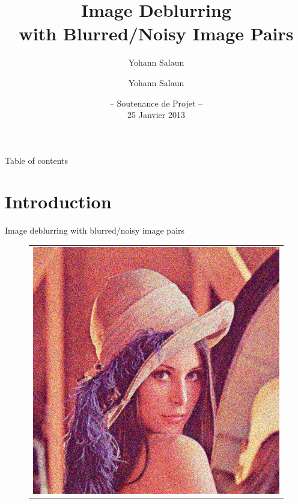 \documentclass[french]{beamer}
\title[Image Deblurring with Blurred/Noisy Image Pairs]{Image Deblurring \\ with Blurred/Noisy Image Pairs}
\author{Yohann Salaun}
\author[Yohann Salaun] 
{Yohann Salaun}
\institute[MVA - Introduction à l'imagerie Numérique] 
{MVA - Introduction à l'imagerie Numérique}
\date[25 Janvier 2013] %
{-- Soutenance de Projet --\\ 25 Janvier 2013}
\theoremstyle{plain}
\theoremstyle{remark}
\begin{document}
\begin{frame}
  \titlepage
\end{frame}

\begin{frame}{Table of contents}
  \tableofcontents
\end{frame}


\section{Introduction}

\begin{frame}{Image deblurring with blurred/noisy image pairs}

\begin{figure}[ht]
\begin{center}
	\begin{tabular}{c}	
		\includegraphics[scale=0.18]{images/lena_noisy.jpg}

\end{tabular}
\end{center}
\end{figure}
\end{frame}
\end{document}
